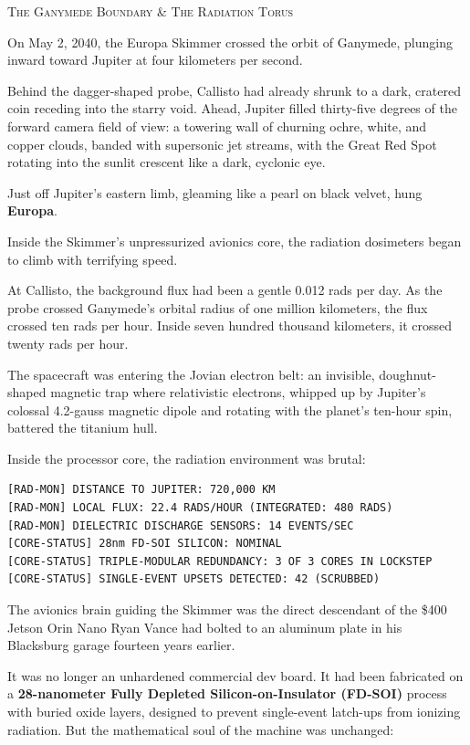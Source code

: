 \documentclass[12pt,twoside,openright]{book}
\newcommand{\sceneheader}[1]{%
  \par\vspace{1.8em}%
  {\noindent\centering\scshape\large #1\par}%
  \vspace{1.0em}%
  \noindent%
}
\begin{document}
\sceneheader{The Ganymede Boundary \& The Radiation
Torus}

On May 2, 2040, the Europa Skimmer crossed the orbit of Ganymede,
plunging inward toward Jupiter at four kilometers per second.

Behind the dagger-shaped probe, Callisto had already shrunk to a dark,
cratered coin receding into the starry void. Ahead, Jupiter filled
thirty-five degrees of the forward camera field of view: a towering wall
of churning ochre, white, and copper clouds, banded with supersonic jet
streams, with the Great Red Spot rotating into the sunlit crescent like
a dark, cyclonic eye.

Just off Jupiter's eastern limb, gleaming like a pearl on black velvet,
hung \textbf{Europa}.

Inside the Skimmer's unpressurized avionics core, the radiation
dosimeters began to climb with terrifying speed.

At Callisto, the background flux had been a gentle 0.012 rads per day.
As the probe crossed Ganymede's orbital radius of one million
kilometers, the flux crossed ten rads per hour. Inside seven hundred
thousand kilometers, it crossed twenty rads per hour.

The spacecraft was entering the Jovian electron belt: an invisible,
doughnut-shaped magnetic trap where relativistic electrons, whipped up
by Jupiter's colossal 4.2-gauss magnetic dipole and rotating with the
planet's ten-hour spin, battered the titanium hull.

Inside the processor core, the radiation environment was brutal:

\begin{lstlisting}
[RAD-MON] DISTANCE TO JUPITER: 720,000 KM
[RAD-MON] LOCAL FLUX: 22.4 RADS/HOUR (INTEGRATED: 480 RADS)
[RAD-MON] DIELECTRIC DISCHARGE SENSORS: 14 EVENTS/SEC
[CORE-STATUS] 28nm FD-SOI SILICON: NOMINAL
[CORE-STATUS] TRIPLE-MODULAR REDUNDANCY: 3 OF 3 CORES IN LOCKSTEP
[CORE-STATUS] SINGLE-EVENT UPSETS DETECTED: 42 (SCRUBBED)
\end{lstlisting}

The avionics brain guiding the Skimmer was the direct descendant of the
\$400 Jetson Orin Nano Ryan Vance had bolted to an aluminum plate in his
Blacksburg garage fourteen years earlier.

It was no longer an unhardened commercial dev board. It had been
fabricated on a \textbf{28-nanometer Fully Depleted Silicon-on-Insulator
(FD-SOI)} process with buried oxide layers, designed to prevent
single-event latch-ups from ionizing radiation. But the mathematical
soul of the machine was unchanged:
\end{document}
